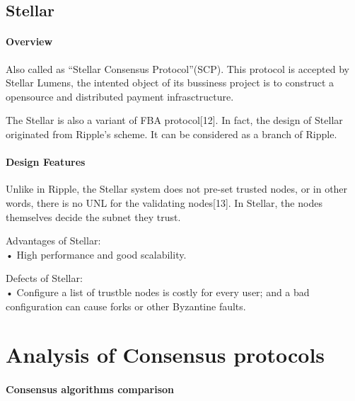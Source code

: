 \documentclass[doublespacing]{bmcart}
\begin{document}
\begin{CJK*}{UTF8}{gbsn}
	
	\subsection{\textbf{Stellar}}
	\paragraph{\textbf{Overview}}
	Also called as ``Stellar Consensus Protocol''(SCP). This protocol is accepted by Stellar Lumens, the intented object of its bussiness project is to construct a opensource and distributed payment infrasctructure.
	
	The Stellar is also a variant of FBA protocol[12]. In fact, the design of Stellar originated from Ripple's scheme. It can be considered as a branch of Ripple.
	\paragraph{\textbf{Design Features}}	
	
	
	 Unlike in Ripple, the Stellar system does not pre-set trusted nodes, or in other words, there is no UNL for the validating nodes[13]. In Stellar, the nodes themselves decide the subnet they trust. 
	 
Advantages of Stellar:
\\• High performance and good scalability.
	 
Defects of Stellar:	
\\• Configure a list of trustble nodes is costly for every user; and a bad configuration can cause forks or other Byzantine faults.

\newpage
\section{Analysis of Consensus protocols}

\paragraph{Consensus algorithms comparison} 


\end{CJK*}
\end{document}

